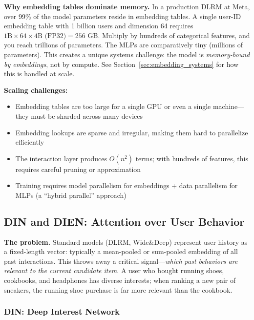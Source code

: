 \textbf{Why embedding tables dominate memory.} In a production DLRM at Meta, over 99\% of the model parameters reside in embedding tables. A single user-ID embedding table with 1 billion users and dimension 64 requires $1\text{B} \times 64 \times 4\text{B (FP32)} = 256$ GB. Multiply by hundreds of categorical features, and you reach trillions of parameters. The MLPs are comparatively tiny (millions of parameters). This creates a unique systems challenge: the model is \textit{memory-bound by embeddings}, not by compute. See Section~\ref{sec:embedding_systems} for how this is handled at scale.

\textbf{Scaling challenges:}
\begin{itemize}
    \item Embedding tables are too large for a single GPU or even a single machine---they must be sharded across many devices
    \item Embedding lookups are sparse and irregular, making them hard to parallelize efficiently
    \item The interaction layer produces $O(n^2)$ terms; with hundreds of features, this requires careful pruning or approximation
    \item Training requires model parallelism for embeddings + data parallelism for MLPs (a ``hybrid parallel'' approach)
\end{itemize}

\subsection{DIN and DIEN: Attention over User Behavior}
\label{sec:din_dien}

\textbf{The problem.} Standard models (DLRM, Wide\&Deep) represent user history as a fixed-length vector: typically a mean-pooled or sum-pooled embedding of all past interactions. This throws away a critical signal---\textit{which past behaviors are relevant to the current candidate item}. A user who bought running shoes, cookbooks, and headphones has diverse interests; when ranking a new pair of sneakers, the running shoe purchase is far more relevant than the cookbook.

\subsubsection{DIN: Deep Interest Network}

